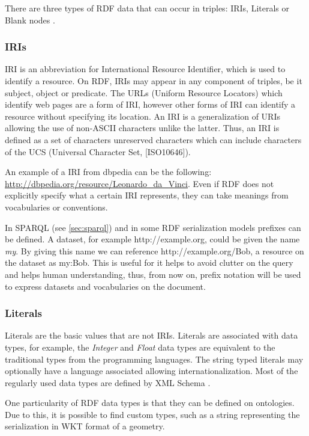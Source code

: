 There are three types of RDF data that can occur in triples: IRIs, Literals or Blank nodes \cite{rdfprimer11}.

\subsubsection*{IRIs}

IRI is an abbreviation for International Resource Identifier, which is used to identify a resource. On RDF, IRIs may appear in any component of triples, be it subject, object or predicate. The URLs (Uniform Resource Locators) which identify web pages are a form of IRI, however other forms of IRI can identify a resource without specifying its location. An IRI is a generalization of URIs allowing the use of non-ASCII characters unlike the latter. Thus, an IRI is defined as a set of characters unreserved characters which can include characters of the UCS \cite{rfc3986,rfc3987}(Universal Character Set, [ISO10646]).

An example of a IRI from dbpedia can be the following: \url{http://dbpedia.org/resource/Leonardo_da_Vinci}. Even if RDF does not explicitly specify what a certain IRI represents, they can take meanings from vocabularies or conventions.

In SPARQL (see \ref{sec:sparql}) and in some RDF serialization models prefixes can be defined. A dataset, for example http://example.org, could be given the name \textit{my}. By giving this name we can reference http://example.org/Bob, a resource on the dataset as my:Bob. This is useful for it helps to avoid clutter on the query and helps human understanding, thus, from now on, prefix notation will be used to express datasets and vocabularies on the document.

\subsubsection*{Literals}

Literals are the basic values that are not IRIs. Literals are associated with data types, for example, the \textit{Integer} and \textit{Float} data types are equivalent to the traditional types from the programming languages. The string typed literals may optionally have a language associated allowing internationalization. Most of the regularly used data types are defined by XML Schema \cite{xmlschema}.

One particularity of RDF data types is that they can be defined on ontologies. Due to this, it is possible to find custom types, such as a string representing the serialization in WKT \cite{wkt} format of a geometry. 

